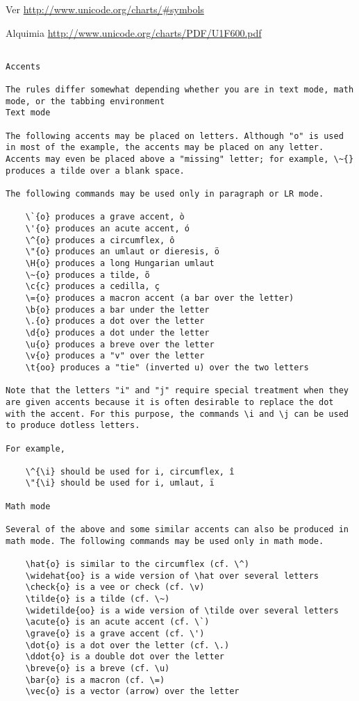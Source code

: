\documentclass{article}
\begin{document}
Ver \url{http://www.unicode.org/charts/#symbols}

Alquimia \url{http://www.unicode.org/charts/PDF/U1F600.pdf}


\begin{verbatim}

Accents

The rules differ somewhat depending whether you are in text mode, math mode, or the tabbing environment
Text mode

The following accents may be placed on letters. Although "o" is used in most of the example, the accents may be placed on any letter. Accents may even be placed above a "missing" letter; for example, \~{} produces a tilde over a blank space.

The following commands may be used only in paragraph or LR mode.

    \`{o} produces a grave accent, ò
    \'{o} produces an acute accent, ó
    \^{o} produces a circumflex, ô
    \"{o} produces an umlaut or dieresis, ö
    \H{o} produces a long Hungarian umlaut
    \~{o} produces a tilde, õ
    \c{c} produces a cedilla, ç
    \={o} produces a macron accent (a bar over the letter)
    \b{o} produces a bar under the letter
    \.{o} produces a dot over the letter
    \d{o} produces a dot under the letter
    \u{o} produces a breve over the letter
    \v{o} produces a "v" over the letter
    \t{oo} produces a "tie" (inverted u) over the two letters

Note that the letters "i" and "j" require special treatment when they are given accents because it is often desirable to replace the dot with the accent. For this purpose, the commands \i and \j can be used to produce dotless letters.

For example,

    \^{\i} should be used for i, circumflex, î
    \"{\i} should be used for i, umlaut, ï

Math mode

Several of the above and some similar accents can also be produced in math mode. The following commands may be used only in math mode.

    \hat{o} is similar to the circumflex (cf. \^)
    \widehat{oo} is a wide version of \hat over several letters
    \check{o} is a vee or check (cf. \v)
    \tilde{o} is a tilde (cf. \~)
    \widetilde{oo} is a wide version of \tilde over several letters
    \acute{o} is an acute accent (cf. \`)
    \grave{o} is a grave accent (cf. \')
    \dot{o} is a dot over the letter (cf. \.)
    \ddot{o} is a double dot over the letter
    \breve{o} is a breve (cf. \u)
    \bar{o} is a macron (cf. \=)
    \vec{o} is a vector (arrow) over the letter


\end{verbatim}
\end{document}
